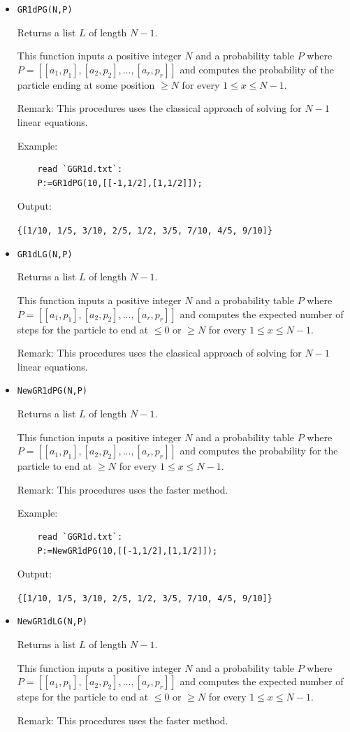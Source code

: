 \documentclass[reqno]{amsart}
\theoremstyle{definition}
\theoremstyle{definition}
\theoremstyle{remark}
\begin{document}
\begin{itemize}
\item \lstinline{GR1dPG(N,P)}

    Returns a list $L$ of length $N-1$.
    
    This function inputs a positive integer $N$ and a probability table $P$ where $P=[[a_1,p_1],[a_2,p_2],...,[a_r,p_r]]$ and computes the probability of the particle ending at some position $\geq N$ for every $1\leq x \leq N-1$.
    
    Remark: This procedures uses the classical approach of solving for $N-1$ linear equations.

    Example:
    
    \begin{lstlisting}
    read `GGR1d.txt`:
    P:=GR1dPG(10,[[-1,1/2],[1,1/2]]);
    \end{lstlisting}
    Output:
    
    \lstinline!{[1/10, 1/5, 3/10, 2/5, 1/2, 3/5, 7/10, 4/5, 9/10]}!

    \item \lstinline{GR1dLG(N,P)}
    
    Returns a list $L$ of length $N-1$.
    
    This function inputs a positive integer $N$ and a probability table $P$ where $P=[[a_1,p_1],[a_2,p_2],...,[a_r,p_r]]$ and computes the expected number of steps for the particle to end at $\leq 0$ or $\geq N$ for every $1\leq x \leq N-1$.

    Remark: This procedures uses the classical approach of solving for $N-1$ linear equations.

    \item \lstinline{NewGR1dPG(N,P)}
    
    Returns a list $L$ of length $N-1$.
    
    This function inputs a positive integer $N$ and a probability table $P$ where $P=[[a_1,p_1],[a_2,p_2],...,[a_r,p_r]]$ and computes the probability for the particle to end at $\geq N$ for every $1\leq x \leq N-1$.

    Remark: This procedures uses the faster method.

    Example:
    
    \begin{lstlisting}
    read `GGR1d.txt`:
    P:=NewGR1dPG(10,[[-1,1/2],[1,1/2]]);
    \end{lstlisting}
    Output:
    
    \lstinline!{[1/10, 1/5, 3/10, 2/5, 1/2, 3/5, 7/10, 4/5, 9/10]}!
    
     \item \lstinline{NewGR1dLG(N,P)}
    
    Returns a list $L$ of length $N-1$.
    
    This function inputs a positive integer $N$ and a probability table $P$ where $P=[[a_1,p_1],[a_2,p_2],...,[a_r,p_r]]$ and computes the expected number of steps for the particle to end at $\leq 0$ or $\geq N$ for every $1\leq x \leq N-1$.

    Remark: This procedures uses the faster method.
\end{itemize}
\end{document}
